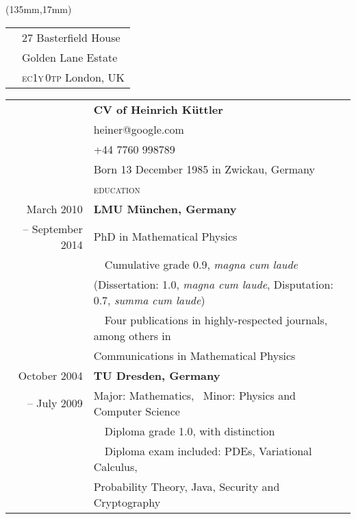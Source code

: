 \documentclass[11pt,english,a4paper]{memoir}
\makeatletter
\newcommand{\smallcaps}[1]{\textsc{\MakeLowercase{#1}}}
\newcommand{\heinrichkuettleratgmaildotcom}{hein\rlap{\textcolor{white}{hugo@egon}}rich.kue\rlap{\textcolor{white}{@symmetry is overrated}}ttler@\rlap{\textcolor{white}{yesihatespamspamspam}}g\rlap{\textcolor{white}{spam@spam@spam!}}ma\rlap{\textcolor{white}{.de}}il.com}
\renewcommand{\heinrichkuettleratgmaildotcom}{hein\rlap{\textcolor{white}{ - }}rich.kue\rlap{\textcolor{white}{ }}ttler@\rlap{\textcolor{white}{}}g\rlap{\textcolor{white}{}}ma\rlap{\textcolor{white}{}}il.com}
\newcommand{\heineratgoogledotcom}{hein\rlap{\textcolor{white}{hugo@egon}}e\rlap{\textcolor{white}{@symmetry is overrated}}r@\rlap{\textcolor{white}{yesihatespamspamspam}}g\rlap{\textcolor{white}{spam@spam@spam!}}oo\rlap{\textcolor{white}{.de}}gle.com}
\newcommand{\red}{\color{Maroon}}
\newcommand{\header}[1]{%
  \addlinespace[2ex]
  & \large{\red\textsc{\MakeLowercase{#1}}} \tabularnewline
  \midrule}
\newcommand{\n}{\tabularnewline}
\newcommand{\bull}{\Pisymbol{MinionPro-Extra}{146}~~}
\newcommand{\nobull}{\phantom{\bull}}
\makeatother
\begin{document}
\begin{textblock*}{3.7cm}(135mm,17mm)
\begin{tabular}{rl}
  & 27 Basterfield House \n
  & Golden Lane Estate \n
  & \smallcaps{EC1Y\,0TP} London, {UK} \n
\end{tabular}
\end{textblock*}

\begin{center}



\begin{tabular}{rl}
  & \textbf{CV of Heinrich Küttler} \n
  & \heineratgoogledotcom \n
  & +44 7760 998789 \n \addlinespace
  & Born 13 December 1985 in Zwickau, Germany \n \addlinespace[0.5ex]

  \header{Education}
  March 2010        & \textbf{LMU München, Germany} \n
  -- September 2014 & PhD in Mathematical Physics \n
  & \bull Cumulative grade 0.9, \textit{magna cum laude} \\
  & \nobull (Dissertation: 1.0, \textit{magna cum laude}, Disputation:
  0.7, \textit{summa cum laude}) \n
  & \bull Four publications in highly-respected journals, among others in \\
  & \nobull Communications in Mathematical Physics

  \n \addlinespace
  October 2004  & \textbf{TU Dresden, Germany} \n
  -- July 2009  & Major: Mathematics, \ Minor: Physics and Computer Science \n
  & \bull Diploma grade 1.0, with distinction \n
  & \bull Diploma exam included: PDEs, Variational Calculus,\\
  & \nobull Probability Theory, Java, Security and Cryptography


\end{tabular}
\end{center}
\end{document}
